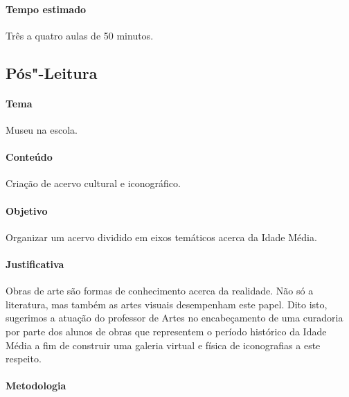 \documentclass[12pt]{extarticle}
\begin{document}
 \paragraph{Tempo estimado} Três a quatro aulas de 50 minutos.


\subsection{Pós"-Leitura}

 \paragraph{Tema} Museu na escola.

 \paragraph{Conteúdo} Criação de acervo cultural e iconográfico.

 \paragraph{Objetivo} Organizar um acervo dividido em eixos temáticos acerca da Idade Média.

 \paragraph{Justificativa} Obras de arte são formas de conhecimento acerca da realidade. 
 Não só a literatura, mas também as artes visuais desempenham este papel. Dito isto,
 sugerimos a atuação do professor de Artes no encabeçamento de uma curadoria por 
 parte dos alunos de obras que representem o período histórico da Idade Média a fim
 de construir uma galeria virtual e física de iconografias a este respeito. 

 \paragraph{Metodologia}
 	
\end{document}
